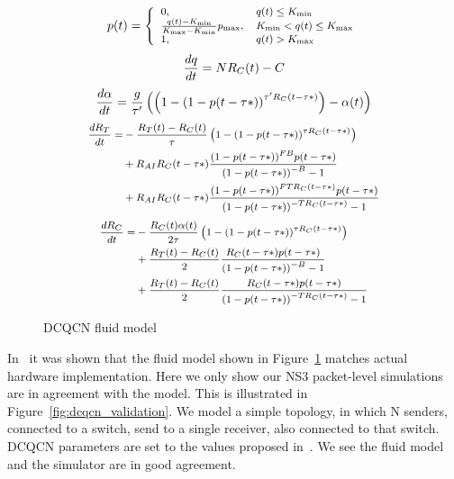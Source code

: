 \begin{figure}[h]
\fbox 
{
\begin{minipage}{\columnwidth}
\begin{equation}
\small
p(t) = \left\{ \begin{array}{ll}
{\rm{0,}} & q(t) \le {K_{\min }}\\
\frac{{q(t) - {K_{\min }}}}{{{K_{\max }} - {K_{\min }}}}{p_{\max }}, & {K_{\min }} < q(t) \le {K_{\max }}\\
{\rm{1,}} & q(t) > {K_{\max }}
\end{array} \right.
\label{eq:mark}
\end{equation}
\begin{equation}
\small
\frac{{dq}}{{dt}} = N{R_C}(t) - C
\label{eq:q}
\end{equation}
\begin{equation}
\small
\frac{{d\alpha }}{{dt}} = \frac{g}{{\tau '}}\left( {\left( {1 - {{(1 - p(t - \tau *))}^{\tau '{R_C}(t - \tau *)}}} \right) - \alpha (t)} \right)
\label{eq:alpha}
\end{equation}
\begin{equation}
\small
\begin{split}
\frac{{d{R_T}}}{{dt}} = & - \frac{{{R_T}(t) - {R_C}(t)}}{\tau }\left( {1 - {{(1 - p(t - \tau *))}^{\tau {R_C}(t - \tau *)}}} \right) \\
& + {R_{AI}}{R_C}(t - \tau *)\frac{{{{(1 - p(t - \tau *))}^{FB}}p(t - \tau *)}}{{{{(1 - p(t - \tau *))}^{ - B}} - 1}} \\
& + {R_{AI}}{R_C}(t - \tau *)\frac{{{{(1 - p(t - \tau *))}^{FT{R_C}(t - \tau *)}}p(t - \tau *)}}{{{{(1 - p(t - \tau *))}^{ - T{R_C}(t - \tau *)}} - 1}}
\end{split}
\label{eq:rt}
\end{equation}
\begin{equation}
\small
\begin{split}
\frac{{d{R_C}}}{{dt}} = & - \frac{{{R_C}(t)\alpha (t)}}{{2\tau }}\left( {1 - {{(1 - p(t - \tau *))}^{\tau {R_C}(t - \tau *)}}} \right) \\
 & + \frac{{{R_T}(t) - {R_C}(t)}}{2}\frac{{{R_C}(t - \tau *)p(t - \tau *)}}{{{{(1 - p(t - \tau *))}^{ - B}} - 1}} \\ 
 & + \frac{{{R_T}(t) - {R_C}(t)}}{2}\frac{{{R_C}(t - \tau *)p(t - \tau *)}}{{{{(1 - p(t - \tau *))}^{ - T{R_C}(t - \tau *)}} - 1}}
\end{split}
\label{eq:rc}
\end{equation}
\end{minipage}
}
\caption{DCQCN fluid model}
\label{fig:dcqcn_model}
\end{figure}

In~\cite{dcqcn} it was shown that the fluid model shown in
Figure~\ref{fig:dcqcn_model} matches actual hardware implementation. Here we
only show our NS3 packet-level simulations are in agreement with the model. This
is illustrated in Figure~\ref{fig:dcqcn_validation}. We model a simple topology,
in which N senders, connected to a switch, send to a single receiver, also
connected to that switch. DCQCN parameters are set to the values proposed
in~\cite{dcqcn}.  We see the fluid model and the simulator are in good
agreement.

